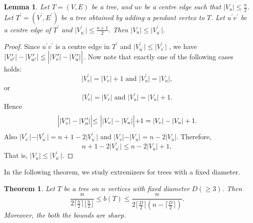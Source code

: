 \documentclass[12pt]{article}
\newtheorem{theorem}{Theorem}[section]
\newtheorem{lemma}{Lemma}[section]
\begin{document}
    \begin{lemma}\label{pendant-vertex-smaller-set-domination}
    Let $T=(V, E)$ be a tree, and $uv$ be a centre edge such that $\vert V_u \vert \leq \frac{n}{2}$. Let $T^\prime=(V^\prime, E^\prime)$ be a tree obtained by adding a pendant vertex to $T$. Let $u^\prime v^\prime$ be a centre edge of $T^\prime$ and $\vert V^\prime_{u^\prime} \vert\leq \frac{n+1}{2}.$ Then $\vert V_u \vert \leq \vert V^\prime_{u^\prime}\vert.$
\end{lemma}
\begin{proof}
    Since $u^\prime v^\prime$ is a centre edge in $T^\prime$ and $\vert V^\prime_{u^\prime}\vert \leq \vert V^\prime_{v^\prime}\vert$ , we have $  \vert V^\prime_{v^\prime}\vert - \vert V^\prime_{u^\prime}\vert \leq \Bigl| \vert V^\prime_{v}\vert - \vert V^\prime_{u}\vert \Bigl|$. Now note that exactly one of the following cases holds:
    $$
\vert V^\prime_v \vert=\vert V_v \vert+1 \text{ and } \vert V^\prime_u \vert=\vert V_u \vert,
    $$
    or
    $$
\vert V^\prime_v \vert=\vert V_v \vert \text{ and } \vert V^\prime_u \vert=\vert V_u \vert+1.
    $$
    Hence $$\Bigl| \vert V^\prime_{v}\vert - \vert V^\prime_{u}\vert \Bigl| \leq \Bigl| \vert V_{v}\vert - \vert V_{u}\vert \Bigl|+1=\vert V_{v}\vert - \vert V_{u}\vert+1.$$
    Also $\vert V^\prime_{v^\prime}\vert - \vert V^\prime_{u^\prime}\vert=n+1-2\vert V^\prime_{u^\prime}\vert$ and $\vert V_{v}\vert - \vert V_{u}\vert =n-2\vert V_{u}\vert$. Therefore,
    $$
n+1-2\vert V^\prime_{u^\prime}\vert\leq n-2\vert V_{u}\vert+1,
    $$
   That is,   $\vert V_u \vert \leq \vert V^\prime_{u^\prime}\vert.$

\end{proof}
In the following theorem, we study extremizers for trees with a fixed diameter.
\begin{theorem}\label{diameter-extremizer}
    Let $T$ be a tree on $n$ vertices with fixed diameter $D(\geq 3)$. Then 
    $$
\frac{n}{2\lceil \frac{n}{2}\rceil \lfloor \frac{n}{2}\rfloor} \leq b(T) \leq \frac{n}{2\lceil \frac{D}{2} \rceil(n-\lceil \frac{D}{2} \rceil)}
    .$$ Moreover, the both the bounds are sharp.

\end{theorem}
\end{document}
